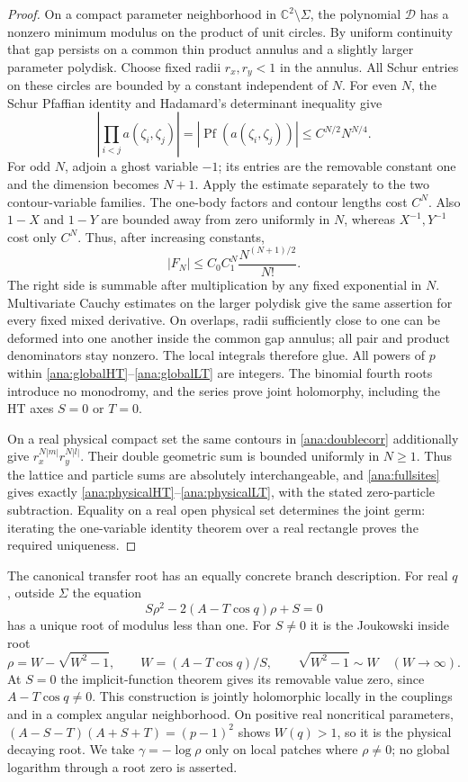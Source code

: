 \documentclass[11pt]{article}
\numberwithin{equation}{section}
\theoremstyle{definition}
\newcommand{\C}{\mathbb C}
\begin{document}
\begin{proof}
On a compact parameter neighborhood in \(\C^2\setminus\Sigma\),
the polynomial \(\mathcal D\) has a nonzero minimum modulus on the
product of unit circles. By uniform continuity that gap persists on
a common thin product annulus and a slightly larger parameter
polydisk. Choose fixed radii \(r_x,r_y<1\) in the annulus.
All Schur entries on these circles are bounded by a constant
independent of \(N\). For even \(N\), the Schur Pfaffian identity
and Hadamard's determinant inequality give
\[
 \left|\prod_{i<j}a(\zeta_i,\zeta_j)\right|
 =|\operatorname{Pf}(a(\zeta_i,\zeta_j))|
 \le C^{N/2}N^{N/4}.
\]
For odd \(N\), adjoin a ghost variable \(-1\); its entries are
the removable constant one and the dimension becomes \(N+1\).
Apply the estimate separately to the two contour-variable families.
The one-body factors and contour lengths cost \(C^N\).
Also \(1-X\) and \(1-Y\) are bounded away from zero uniformly in
\(N\), whereas \(X^{-1},Y^{-1}\) cost only \(C^N\).
Thus, after increasing constants,
\begin{equation}\label{ana:compactbound}
 |F_N|\le C_0 C_1^N\frac{N^{(N+1)/2}}{N!}.
\end{equation}
The right side is summable after multiplication by any fixed
exponential in \(N\). Multivariate Cauchy estimates on the larger
polydisk give the same assertion for every fixed mixed derivative.
On overlaps, radii sufficiently close to one can be deformed into
one another inside the common gap annulus; all pair and product
denominators stay nonzero. The local integrals therefore glue.
All powers of \(p\) within \eqref{ana:globalHT}--\eqref{ana:globalLT}
are integers. The binomial fourth roots introduce no monodromy,
and the series prove joint holomorphy, including the HT axes
\(S=0\) or \(T=0\).

On a real physical compact set the same contours in
\eqref{ana:doublecorr} additionally give
\(r_x^{N|m|}r_y^{N|l|}\). Their double geometric sum is bounded
uniformly in \(N\ge1\). Thus the lattice and particle sums are
absolutely interchangeable, and \eqref{ana:fullsites} gives exactly
\eqref{ana:physicalHT}--\eqref{ana:physicalLT}, with the stated
zero-particle subtraction. Equality on a real open physical set
determines the joint germ: iterating the one-variable identity
theorem over a real rectangle proves the required uniqueness.
\end{proof}

The canonical transfer root has an equally concrete branch description.
For real \(q\), outside \(\Sigma\) the equation
\[
 S\rho^2-2(A-T\cos q)\rho+S=0
\]
has a unique root of modulus less than one. For \(S\ne0\) it is the
Joukowski inside root
\[
 \rho=W-\sqrt{W^2-1},\qquad W=(A-T\cos q)/S,
 \qquad \sqrt{W^2-1}\sim W\quad(W\longrightarrow\infty).
\]
At \(S=0\) the implicit-function theorem gives its removable value
zero, since \(A-T\cos q\ne0\). This construction is jointly
holomorphic locally in the couplings and in a complex angular
neighborhood. On positive real noncritical parameters,
\((A-S-T)(A+S+T)=(p-1)^2\) shows \(W(q)>1\), so it is the
physical decaying root. We take \(\gamma=-\log\rho\) only on
local patches where \(\rho\ne0\); no global logarithm through a root
zero is asserted.
\end{document}
